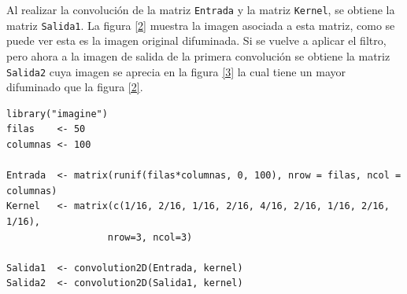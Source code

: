 \documentclass[12pt,letterpaper]{article}
\begin{document}
Al realizar la convolución de la matriz \texttt{Entrada} y la matriz \texttt{Kernel}, se obtiene la matriz \texttt{Salida1}. La figura \ref{2} muestra la imagen asociada a esta matriz, como se puede ver esta es la imagen original difuminada. Si se vuelve a aplicar el filtro, pero ahora a la imagen de salida de la primera convolución se obtiene la matriz \texttt{Salida2} cuya imagen se aprecia en la figura \ref{3} la cual tiene un mayor difuminado que la figura \ref{2}.

\begin{lstlisting}[label=lst:gc2,caption=Implementación de la convolución en R., frame = single]
library("imagine")
filas    <- 50
columnas <- 100

Entrada  <- matrix(runif(filas*columnas, 0, 100), nrow = filas, ncol = columnas)
Kernel   <- matrix(c(1/16, 2/16, 1/16, 2/16, 4/16, 2/16, 1/16, 2/16, 1/16),
			      nrow=3, ncol=3)

Salida1  <- convolution2D(Entrada, kernel)
Salida2  <- convolution2D(Salida1, kernel)
\end{lstlisting}
\end{document}
